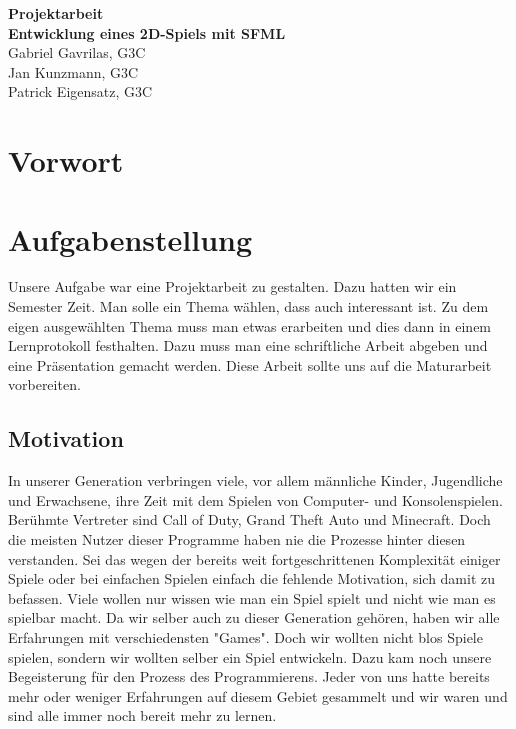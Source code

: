 \documentclass[12pt,a4paper]{scrartcl}
\begin{document}
\begin{titlepage}
\begin{center}

\vspace*{3cm}
\textbf{\huge{Projektarbeit}}\\
\vspace*{2cm}
\textbf{\large{Entwicklung eines 2D-Spiels mit SFML}}\\
\vspace*{5cm}
Gabriel Gavrilas, G3C\\
Jan Kunzmann, G3C\\
Patrick Eigensatz, G3C
\end{center}
\end{titlepage}




\newpage

\setcounter{page}{1}
\section*{Vorwort}


\newpage

\tableofcontents

\newpage

\section{Aufgabenstellung} 
Unsere Aufgabe war eine Projektarbeit zu gestalten. Dazu hatten wir ein Semester Zeit. Man solle ein Thema
wählen, dass auch  interessant ist. Zu dem eigen ausgewählten Thema muss man etwas erarbeiten und dies dann in einem Lernprotokoll festhalten.
Dazu muss man eine schriftliche Arbeit abgeben und eine Präsentation gemacht werden. Diese Arbeit sollte uns auf die Maturarbeit
vorbereiten.

\subsection{Motivation}
In unserer Generation verbringen viele, vor allem männliche Kinder, Jugendliche und Erwachsene,
ihre Zeit mit dem Spielen von Computer- und Konsolenspielen.
Berühmte Vertreter sind Call of Duty, Grand Theft Auto und Minecraft.
Doch die meisten Nutzer dieser Programme haben nie die Prozesse hinter diesen verstanden.
Sei das wegen der bereits weit fortgeschrittenen Komplexität einiger Spiele 
oder bei einfachen Spielen einfach die fehlende Motivation, sich damit zu befassen.
Viele wollen nur wissen wie man ein Spiel spielt und nicht wie man es spielbar macht.
Da wir selber auch zu dieser Generation gehören, 
haben wir alle Erfahrungen mit verschiedensten "Games".
Doch wir wollten nicht blos Spiele spielen, 
sondern wir wollten selber ein Spiel entwickeln.
Dazu kam noch unsere Begeisterung für den Prozess des Programmierens.
Jeder von uns hatte bereits mehr oder weniger Erfahrungen auf diesem Gebiet gesammelt 
und wir waren und sind alle immer noch bereit mehr zu lernen.
\end{document}
